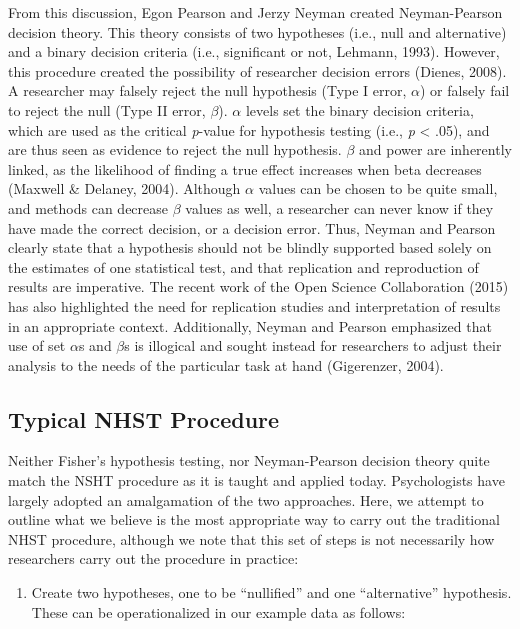 \documentclass[english,man]{apa6}
\providecommand{\tightlist}{%
  \setlength{\itemsep}{0pt}\setlength{\parskip}{0pt}}
\theoremstyle{definition}
\theoremstyle{definition}
\theoremstyle{definition}
\theoremstyle{remark}
\begin{document}
From this discussion, Egon Pearson and Jerzy Neyman created
Neyman-Pearson decision theory. This theory consists of two hypotheses
(i.e., null and alternative) and a binary decision criteria (i.e.,
significant or not, Lehmann, 1993). However, this procedure created the
possibility of researcher decision errors (Dienes, 2008). A researcher
may falsely reject the null hypothesis (Type I error, \(\alpha\)) or
falsely fail to reject the null (Type II error, \(\beta\)). \(\alpha\)
levels set the binary decision criteria, which are used as the critical
\emph{p}-value for hypothesis testing (i.e., \emph{p} \textless{} .05),
and are thus seen as evidence to reject the null hypothesis. \(\beta\)
and power are inherently linked, as the likelihood of finding a true
effect increases when beta decreases (Maxwell \& Delaney, 2004).
Although \(\alpha\) values can be chosen to be quite small, and methods
can decrease \(\beta\) values as well, a researcher can never know if
they have made the correct decision, or a decision error. Thus, Neyman
and Pearson clearly state that a hypothesis should not be blindly
supported based solely on the estimates of one statistical test, and
that replication and reproduction of results are imperative. The recent
work of the Open Science Collaboration (2015) has also highlighted the
need for replication studies and interpretation of results in an
appropriate context. Additionally, Neyman and Pearson emphasized that
use of set \(\alpha\)s and \(\beta\)s is illogical and sought instead
for researchers to adjust their analysis to the needs of the particular
task at hand (Gigerenzer, 2004).

\subsection{Typical NHST Procedure}\label{typical-nhst-procedure}

Neither Fisher's hypothesis testing, nor Neyman-Pearson decision theory
quite match the NSHT procedure as it is taught and applied today.
Psychologists have largely adopted an amalgamation of the two
approaches. Here, we attempt to outline what we believe is the most
appropriate way to carry out the traditional NHST procedure, although we
note that this set of steps is not necessarily how researchers carry out
the procedure in practice:

\begin{enumerate}
\def\labelenumi{\arabic{enumi})}
\tightlist
\item
  Create two hypotheses, one to be \enquote{nullified} and one
  \enquote{alternative} hypothesis. These can be operationalized in our
  example data as follows:
\end{enumerate}
\end{document}

